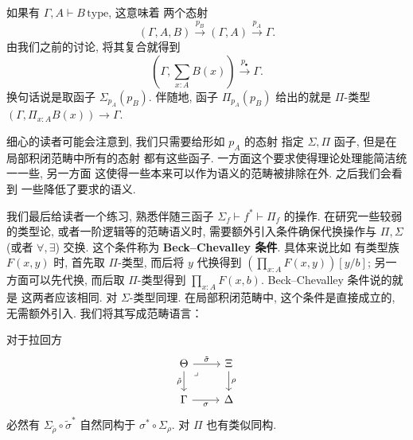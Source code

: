 如果有 \(\Gamma, A \vdash B\,\text{type}\), 这意味着
两个态射
\[(\Gamma, A, B) \xrightarrow{p_B} (\Gamma, A) \xrightarrow{p_A} \Gamma.\]
由我们之前的讨论, 将其复合就得到
\[\left(\Gamma, \sum_{x:A} B(x)\right) \xrightarrow{p_{\bullet}} \Gamma.\]
换句话说是取函子 \(\Sigma_{p_A}(p_B)\). 伴随地, 函子
\(\Pi_{p_A}(p_B)\) 给出的就是 \(\Pi\)-类型
\((\Gamma, \Pi_{x:A} B(x)) \to \Gamma\).

细心的读者可能会注意到, 我们只需要给形如 \(p_A\) 的态射
指定 \(\Sigma,\Pi\) 函子, 但是在局部积闭范畴中所有的态射
都有这些函子. 一方面这个要求使得理论处理能简洁统一一些, 另一方面
这使得一些本来可以作为语义的范畴被排除在外. 之后我们会看到
一些降低了要求的语义.

我们最后给读者一个练习, 熟悉伴随三函子 \(\Sigma_f \vdash f^* \vdash \Pi_f\)
的操作. 在研究一些较弱的类型论, 或者一阶逻辑等的范畴语义时,
需要额外引入条件确保代换操作与 \(\Pi, \Sigma\) (或者
\(\forall, \exists\)) 交换. 这个条件称为
\textbf{Beck--Chevalley 条件}. 具体来说比如
有类型族 \(F(x,y)\) 时, 首先取 \(\Pi\)-类型, 而后将
\(y\) 代换得到 \(\left(\prod_{x:A} F(x, y)\right)[y/b]\);
另一方面可以先代换, 而后取 \(\Pi\)-类型得到
\(\prod_{x:A} F(x, b)\). Beck--Chevalley 条件说的就是
这两者应该相同. 对 \(\Sigma\)-类型同理. 在局部积闭范畴中,
这个条件是直接成立的, 无需额外引入. 我们将其写成范畴语言：
\begin{theorem}
对于拉回方
\[\begin{tikzcd}
  \Theta & \Xi \\
  \Gamma & \Delta
  \arrow["{\tilde\rho}"', from=1-1, to=2-1]
  \arrow["\sigma"', from=2-1, to=2-2]
  \arrow["\rho", from=1-2, to=2-2]
  \arrow["{\tilde\sigma}", from=1-1, to=1-2]
  \arrow["\lrcorner"{anchor=center, pos=0.125}, draw=none, from=1-1, to=2-2]
\end{tikzcd}\]
必然有 \(\Sigma_{\tilde\rho} \circ \tilde\sigma^*\) 自然同构于
\(\sigma^* \circ \Sigma_{\rho}\). 对 \(\Pi\) 也有类似同构.
\end{theorem}
